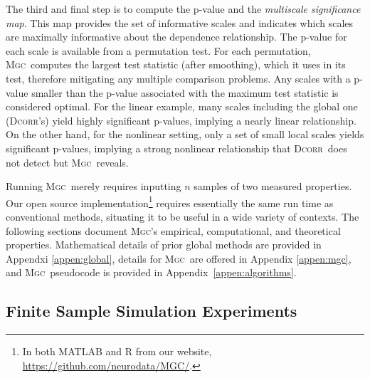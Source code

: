 \documentclass[11pt]{article}
\providecommand{\sct}[1]{{\normalfont\textsc{#1}}}
\providecommand{\mc}[1]{\mathcal{#1}}
\newcommand{\Mgc}{\sct{Mgc}}
\newcommand{\Dcorr}{\sct{Dcorr}}
\newcommand{\website}{\url{https://github.com/neurodata/MGC/}}
\begin{document}
The third and final step is to compute the p-value and the \emph{multiscale significance map}. This map provides the set of informative scales and indicates which scales are maximally informative about the dependence relationship. The p-value for each scale is available from a permutation test.  For each permutation, \Mgc~computes the largest test statistic (after smoothing), which it uses in its test, therefore mitigating any multiple comparison problems.  Any scales with a p-value smaller than the p-value associated with the maximum test statistic is considered optimal.  
For the linear example, many scales including the global one (\Dcorr's) yield highly significant p-values, implying a nearly linear relationship.
On the other hand, for the nonlinear setting, only a set of small local scales yields significant p-values, implying a strong nonlinear relationship that \Dcorr~does not detect but \Mgc~reveals.  


Running \Mgc~merely requires inputting $n$ samples of two measured properties.  
Our open source implementation\footnote{In both MATLAB and R from our website, \website.} requires essentially the same run time as conventional methods, situating it to be useful in a wide variety of contexts. 
The following sections document \Mgc's empirical, computational, and theoretical properties. Mathematical details of prior global methods are provided in Appendxi \ref{appen:global}, details for \Mgc~are offered in Appendix \ref{appen:mgc}, and \Mgc~pseudocode is provided in Appendix~\ref{appen:algorithms}.



\subsection*{Finite Sample Simulation Experiments}
\end{document}
